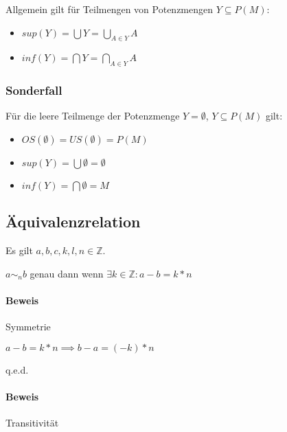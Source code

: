 \documentclass[12pt]{scrreprt}
\newcommand{\qed}{\begin{flushright}q.e.d.\end{flushright}}
\begin{document}
                    Allgemein gilt für Teilmengen von Potenzmengen $ Y \subseteq P(M) $:
                    \begin{itemize}
                        \item $ sup(Y) = \bigcup Y = \bigcup\limits _ { A \in Y } A $
                        \item $ inf(Y) = \bigcap Y = \bigcap\limits _ { A \in Y } A $
                    \end{itemize}


                \subsubsection{Sonderfall}

                    Für die leere Teilmenge der Potenzmenge $ Y = \emptyset $, $ Y \subseteq P(M) $ gilt:
                    \begin{itemize}
                        \item $ OS(\emptyset) = US(\emptyset) = P(M) $
                        \item $ sup(Y) = \bigcup \emptyset = \emptyset $
                        \item $ inf(Y) = \bigcap \emptyset = M $
                    \end{itemize}


            \subsection{Äquivalenzrelation}
                \label{ss:grundbegriffe_mengen_aequivalenzrelationen}

                Es gilt $ a, b, c, k, l, n \in \mathbb{Z} $.

                $ a \sim _ n b $ genau dann wenn $ \exists k \in \mathbb{Z} : a - b = k * n $

                \paragraph{Beweis}
                    Symmetrie

                    $ a - b = k * n \implies b - a = (-k) * n $

                    \qed


                \paragraph{Beweis}
                    Transitivität
\end{document}
